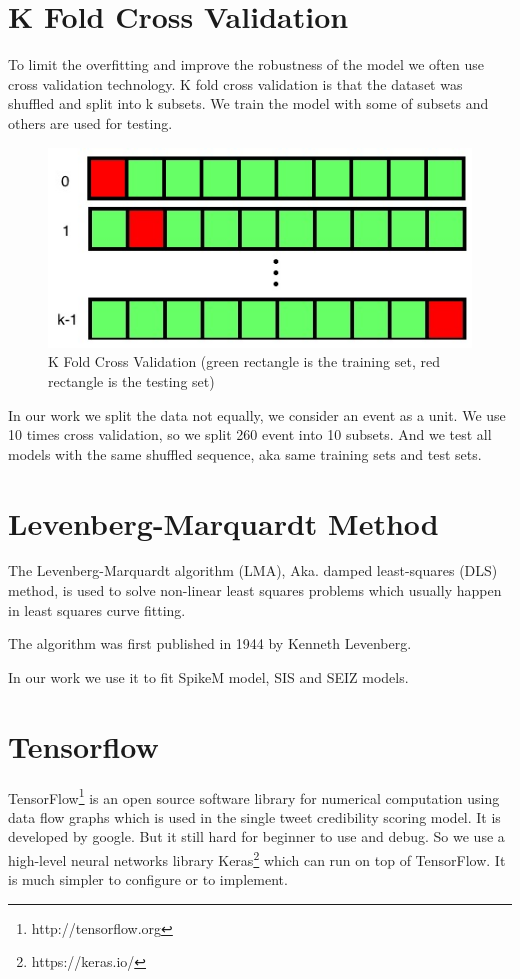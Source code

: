 \newpage
\section{K Fold Cross Validation } 
To limit the overfitting and improve the robustness of the model we often use cross validation technology. K fold cross validation is that the dataset was shuffled and split into k subsets. We train the model with some of subsets and others are used for testing.
\begin{figure}[!h]
\centering
\includegraphics[width=0.55\columnwidth]{images/CrossV.png}
\caption{K Fold Cross Validation (green rectangle is the training set, red rectangle is the testing set)  }
\label{fig:GRU}
\end{figure}

In our work we split the data not equally, we consider an event as a unit.  We use 10 times cross validation, so we split 260 event into 10 subsets. And we test all models with the same shuffled sequence, aka same training sets and test sets.

\section{Levenberg-Marquardt Method} %
\label{sec:LM}
The Levenberg-Marquardt algorithm (LMA), Aka. damped least-squares (DLS) method, is used to solve non-linear least squares problems which usually happen in least squares curve fitting.

The algorithm was first published in 1944 by Kenneth Levenberg\cite{levenberg1944method}. 

In our work we use it to fit SpikeM model, SIS and SEIZ models.

 
\section{Tensorflow } %
TensorFlow\footnote{http://tensorflow.org} is an open source software library for numerical computation using data flow graphs which is used in the single tweet credibility scoring model. It is developed by google. But it still hard for beginner to use and  debug. So we use a high-level neural networks library Keras\footnote{https://keras.io/} which can run on top of TensorFlow. It is much simpler to configure or to implement. 

